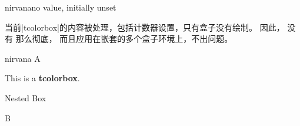 \begin{docTcbKey}[][doc new=2019-03-01]{nirvana}{}{no value, initially unset}

当前|tcolorbox|的内容被处理，包括计数器设置，只有盒子没有绘制。%
因此，  没有  那么彻底，%
而且应用在嵌套的多个盒子环境上，不出问题。
\begin{exdispExample}{nirvana}
A%
  \begin{tcolorbox}[
      title=This box is completely removed by the following key,
      nirvana
    ]
  This is a \textbf{tcolorbox}.
    \begin{tcolorbox}
    Nested Box
    \end{tcolorbox}
  \end{tcolorbox}%
B
\end{exdispExample}
\end{docTcbKey}
